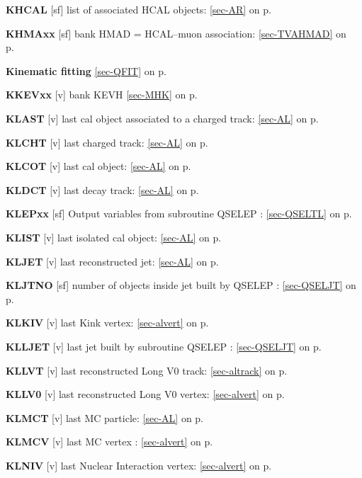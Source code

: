  \item{\bf KHCAL   }[sf] list of associated HCAL objects: \ref{sec-AR} on p.~\pageref{sec-AR}\\
 \item{\bf KHMAxx  }[sf] bank HMAD = HCAL--muon association:
 \ref{sec-TVAHMAD} on p.~\pageref{sec-TVAHMAD}\\
 \item{\bf Kinematic fitting }\ref{sec-QFIT} on p.~\pageref{sec-QFIT}\\
 \item{\bf KKEVxx  }[v] bank KEVH \ref{sec-MHK} on p.~\pageref{sec-MHK}\\
 \item{\bf KLAST   }[v] last cal object associated to a charged track:
 \ref{sec-AL} on p.~\pageref{sec-AL}\\
 \item{\bf KLCHT   }[v] last charged track: \ref{sec-AL} on p.~\pageref{sec-AL}\\
 \item{\bf KLCOT   }[v] last cal object: \ref{sec-AL} on p.~\pageref{sec-AL}\\
 \item{\bf KLDCT   }[v] last decay track: \ref{sec-AL} on p.~\pageref{sec-AL}\\
 \item{\bf KLEPxx  }[sf] Output variables from subroutine QSELEP : \ref{sec-QSELTL} on p.~\pageref{sec-QSELTL}\\
 \item{\bf KLIST   }[v] last isolated cal object: \ref{sec-AL} on p.~\pageref{sec-AL}\\
 \item{\bf KLJET   }[v] last reconstructed jet: \ref{sec-AL} on p.~\pageref{sec-AL}\\
 \item{\bf KLJTNO  }[sf] number of objects inside jet built by QSELEP : \ref{sec-QSELJT} on p.~\pageref{sec-QSELJT}
 
 \item{\bf KLKIV   }[v] last Kink vertex: \ref{sec-alvert} on p.~\pageref{sec-alvert}\\
 \item{\bf KLLJET  }[v] last jet built by subroutine QSELEP : \ref{sec-QSELJT} on p.~\pageref{sec-QSELJT}\\
 \item{\bf KLLVT   }[v] last reconstructed Long V0 track: \ref{sec-altrack} on p.~\pageref{sec-altrack}\\
 \item{\bf KLLV0   }[v] last reconstructed Long V0 vertex: \ref{sec-alvert} on p.~\pageref{sec-alvert}\\
 \item{\bf KLMCT   }[v] last MC particle: \ref{sec-AL} on p.~\pageref{sec-AL}\\
 \item{\bf KLMCV   }[v] last MC vertex  : \ref{sec-alvert} on p.~\pageref{sec-alvert}\\
 \item{\bf KLNIV   }[v] last Nuclear Interaction vertex: \ref{sec-alvert} on p.~\pageref{sec-alvert}
 
